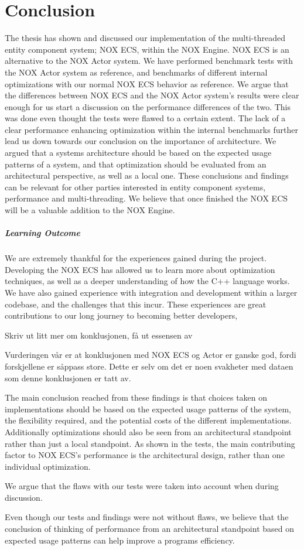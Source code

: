 \chapter{Conclusion}
\label{chap:conclusion}
The thesis has shown and discussed our implementation of the multi-threaded entity
component system; NOX ECS, within the NOX Engine.
NOX ECS is an alternative to the NOX Actor system.
We have performed benchmark tests with the NOX Actor system as reference,
and benchmarks of different internal optimizations with our normal NOX ECS behavior as reference.
We argue that the differences between NOX ECS and the NOX Actor system's results were clear enough for us
start a discussion on the performance differences of the two.
This was done even thought the tests were flawed to a certain extent.
The lack of a clear performance enhancing optimization within the internal benchmarks further
lead us down towards our conclusion on the importance of architecture.
We argued that a systems architecture should be based on the expected usage patterns of a system,
and that optimization should be evaluated from an architectural perspective, as well as a local one.
These conclusions and findings can be relevant for other parties interested
in entity component systems, performance and multi-threading.
We believe that once finished the NOX ECS will be a valuable addition to the NOX Engine.


\paragraph{Learning Outcome}
We are extremely thankful for the experiences gained during the project.
Developing the NOX ECS has allowed us to learn more about optimization techniques,
as well as a deeper understanding of how the C++ language works.
We have also gained experience with integration and development within a larger codebase,
and the challenges that this incur.
These experiences are great contributions to our long journey to becoming better developers,


Skriv ut litt mer om konklusjonen, få ut essensen av

Vurderingen vår er at konklusjonen med NOX ECS og Actor er ganske god, fordi
forskjellene er såppass store. Dette er selv om det er noen svakheter med dataen som denne konklusjonen er tatt av.

The main conclusion reached from these findings is that choices taken on implementations
should be based on the expected usage patterns of the system, the flexibility required,
and the potential costs of the different implementations.
Additionally optimizations should also be seen from an architectural standpoint rather than
just a local standpoint. As shown in the tests, the main contributing factor to NOX ECS's performance
is the architectural design, rather than one individual optimization.


We argue that the flaws with our tests were taken into account when during discussion.

Even though our tests and findings were not without flaws, we believe
that the conclusion of thinking of performance from an architectural standpoint based on
expected usage patterns can help improve a programs efficiency.
